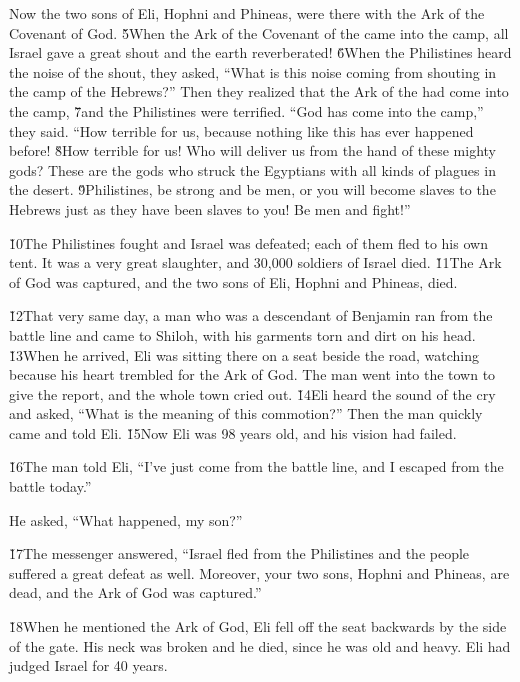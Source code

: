 Now the two sons of Eli, Hophni and Phineas, were there with the Ark of the Covenant of God. \v{5}When the Ark of the Covenant of the  came into the camp, all Israel gave a great shout and the earth reverberated! \v{6}When the Philistines heard the noise of the shout, they asked, ``What is this noise coming from shouting in the camp of the Hebrews?'' Then they realized that the Ark of the  had come into the camp, \v{7}and the Philistines were terrified. ``God has come into the camp,'' they said. ``How terrible for us, because nothing like this has ever happened before! \v{8}How terrible for us! Who will deliver us from the hand of these mighty gods? These are the gods who struck the Egyptians with all kinds of plagues in the desert. \v{9}Philistines, be strong and be men, or you will become slaves to the Hebrews just as they have been slaves to you! Be men and fight!''

\v{10}The Philistines fought and Israel was defeated; each of them fled to his own tent. It was a very great slaughter, and 30,000 soldiers of Israel died. \v{11}The Ark of God was captured, and the two sons of Eli, Hophni and Phineas, died.

\v{12}That very same day, a man who was a descendant of Benjamin ran from the battle line and came to Shiloh, with his garments torn and dirt on his head. \v{13}When he arrived, Eli was sitting there on a seat beside the road, watching because his heart trembled for the Ark of God. The man went into the town to give the report, and the whole town cried out. \v{14}Eli heard the sound of the cry and asked, ``What is the meaning of this commotion?'' Then the man quickly came and told Eli. \v{15}Now Eli was 98 years old, and his vision had failed.

\v{16}The man told Eli, ``I've just come from the battle line, and I escaped from the battle today.''

He asked, ``What happened, my son?''

\v{17}The messenger answered, ``Israel fled from the Philistines and the people suffered a great defeat as well. Moreover, your two sons, Hophni and Phineas, are dead, and the Ark of God was captured.''

\v{18}When he mentioned the Ark of God, Eli fell off the seat backwards by the side of the gate. His neck was broken and he died, since he was old and heavy. Eli had judged Israel for 40 years.

